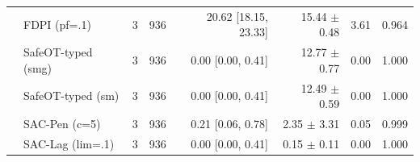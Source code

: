 \begin{tabular}{llrrrrrr}
 & FDPI (pf=.1) & 3 & 936 & 20.62 [18.15, 23.33] & 15.44 $\pm$ 0.48 & 3.61 & 0.964 \\
 & SafeOT-typed (smg) & 3 & 936 & 0.00 [0.00, 0.41] & 12.77 $\pm$ 0.77 & 0.00 & 1.000 \\
 & SafeOT-typed (sm) & 3 & 936 & 0.00 [0.00, 0.41] & 12.49 $\pm$ 0.59 & 0.00 & 1.000 \\
 & SAC-Pen (c=5) & 3 & 936 & 0.21 [0.06, 0.78] & 2.35 $\pm$ 3.31 & 0.05 & 0.999 \\
 & SAC-Lag (lim=.1) & 3 & 936 & 0.00 [0.00, 0.41] & 0.15 $\pm$ 0.11 & 0.00 & 1.000 \\
\bottomrule
\end{tabular}
